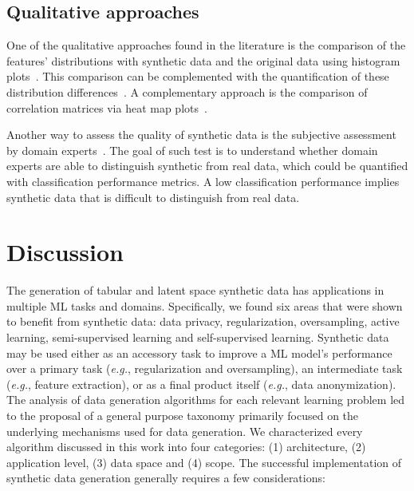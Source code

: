 \subsection{Qualitative approaches}

One of the qualitative approaches found in the literature is the comparison of
the features' distributions with synthetic data and the original data using
histogram plots~\cite{hittmeir2019utility}. This comparison can be
complemented with the quantification of these distribution
differences~\cite{el2020seven}. A complementary approach is the comparison of
correlation matrices via heat map plots~\cite{hittmeir2019utility}.

Another way to assess the quality of synthetic data is the subjective
assessment by domain experts~\cite{el2020seven}. The goal of such test is to
understand whether domain experts are able to distinguish synthetic from real
data, which could be quantified with classification performance metrics. A low
classification performance implies synthetic data that is difficult to
distinguish from real data.

\section{Discussion}\label{sec:discussion-synth}

The generation of tabular and latent space synthetic data has applications in
multiple ML tasks and domains. Specifically, we found six areas that were
shown to benefit from synthetic data: data privacy, regularization,
oversampling, active learning, semi-supervised learning and self-supervised
learning. Synthetic data may be used either as an accessory task to improve a
ML model's performance over a primary task (\textit{e.g.}, regularization and
oversampling), an intermediate task (\textit{e.g.}, feature extraction), or as
a final product itself (\textit{e.g.}, data anonymization). The analysis of
data generation algorithms for each relevant learning problem led to the
proposal of a general purpose taxonomy primarily focused on the underlying
mechanisms used for data generation. We characterized every algorithm
discussed in this work into four categories: (1) architecture, (2) application
level, (3) data space and (4) scope. The successful implementation of
synthetic data generation generally requires a few considerations:

